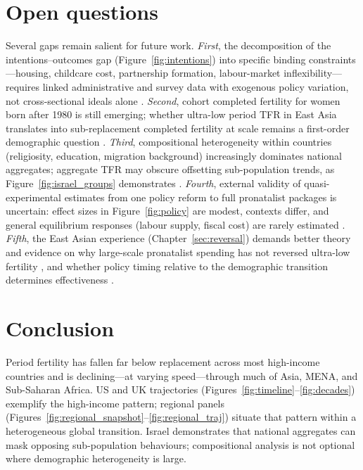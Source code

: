 \documentclass[11pt,a4paper,openany]{book}
\begin{document}
\section{Open questions}
\label{sec:open}
Several gaps remain salient for future work. \emph{First}, the decomposition of the intentions--outcomes gap (Figure~\ref{fig:intentions}) into specific binding constraints---housing, childcare cost, partnership formation, labour-market inflexibility---requires linked administrative and survey data with exogenous policy variation, not cross-sectional ideals alone \citep{doepke2023}. \emph{Second}, cohort completed fertility for women born after 1980 is still emerging; whether ultra-low period TFR in East Asia translates into sub-replacement completed fertility at scale remains a first-order demographic question \citep{kohler2002,sobotka2017}. \emph{Third}, compositional heterogeneity within countries (religiosity, education, migration background) increasingly dominates national aggregates; aggregate TFR may obscure offsetting sub-population trends, as Figure~\ref{fig:israel_groups} demonstrates \citep{okun2013}. \emph{Fourth}, external validity of quasi-experimental estimates from one policy reform to full pronatalist packages is uncertain: effect sizes in Figure~\ref{fig:policy} are modest, contexts differ, and general equilibrium responses (labour supply, fiscal cost) are rarely estimated \citep{sobotka2020,morgan2003}. \emph{Fifth}, the East Asian experience (Chapter~\ref{sec:reversal}) demands better theory and evidence on why large-scale pronatalist spending has not reversed ultra-low fertility \citep{jones2019}, and whether policy timing relative to the demographic transition determines effectiveness \citep{klusener2013,hoem2008}.

\section{Conclusion}
Period fertility has fallen far below replacement across most high-income countries and is declining---at varying speed---through much of Asia, MENA, and Sub-Saharan Africa. US and UK trajectories (Figures~\ref{fig:timeline}--\ref{fig:decades}) exemplify the high-income pattern; regional panels (Figures~\ref{fig:regional_snapshot}--\ref{fig:regional_traj}) situate that pattern within a heterogeneous global transition. Israel demonstrates that national aggregates can mask opposing sub-population behaviours; compositional analysis is not optional where demographic heterogeneity is large.
\end{document}
